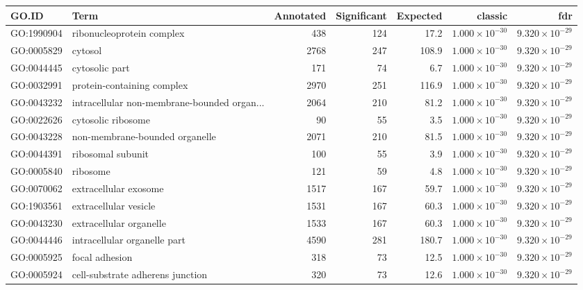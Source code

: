 \begin{table}[ht]
\centering
\begin{tabular}{llrrrrr}
  \hline
GO.ID & Term & Annotated & Significant & Expected & classic & fdr \\ 
  \hline
GO:1990904 & ribonucleoprotein complex & 438 & 124 & 17.2 & $1.000 \times 10^{-30}$ & $9.320 \times 10^{-29}$ \\ 
  GO:0005829 & cytosol & 2768 & 247 & 108.9 & $1.000 \times 10^{-30}$ & $9.320 \times 10^{-29}$ \\ 
  GO:0044445 & cytosolic part & 171 & 74 & 6.7 & $1.000 \times 10^{-30}$ & $9.320 \times 10^{-29}$ \\ 
  GO:0032991 & protein-containing complex & 2970 & 251 & 116.9 & $1.000 \times 10^{-30}$ & $9.320 \times 10^{-29}$ \\ 
  GO:0043232 & intracellular non-membrane-bounded organ... & 2064 & 210 & 81.2 & $1.000 \times 10^{-30}$ & $9.320 \times 10^{-29}$ \\ 
  GO:0022626 & cytosolic ribosome & 90 & 55 & 3.5 & $1.000 \times 10^{-30}$ & $9.320 \times 10^{-29}$ \\ 
  GO:0043228 & non-membrane-bounded organelle & 2071 & 210 & 81.5 & $1.000 \times 10^{-30}$ & $9.320 \times 10^{-29}$ \\ 
  GO:0044391 & ribosomal subunit & 100 & 55 & 3.9 & $1.000 \times 10^{-30}$ & $9.320 \times 10^{-29}$ \\ 
  GO:0005840 & ribosome & 121 & 59 & 4.8 & $1.000 \times 10^{-30}$ & $9.320 \times 10^{-29}$ \\ 
  GO:0070062 & extracellular exosome & 1517 & 167 & 59.7 & $1.000 \times 10^{-30}$ & $9.320 \times 10^{-29}$ \\ 
  GO:1903561 & extracellular vesicle & 1531 & 167 & 60.3 & $1.000 \times 10^{-30}$ & $9.320 \times 10^{-29}$ \\ 
  GO:0043230 & extracellular organelle & 1533 & 167 & 60.3 & $1.000 \times 10^{-30}$ & $9.320 \times 10^{-29}$ \\ 
  GO:0044446 & intracellular organelle part & 4590 & 281 & 180.7 & $1.000 \times 10^{-30}$ & $9.320 \times 10^{-29}$ \\ 
  GO:0005925 & focal adhesion & 318 & 73 & 12.5 & $1.000 \times 10^{-30}$ & $9.320 \times 10^{-29}$ \\ 
  GO:0005924 & cell-substrate adherens junction & 320 & 73 & 12.6 & $1.000 \times 10^{-30}$ & $9.320 \times 10^{-29}$ \\ 

\end{tabular}
\end{table}
